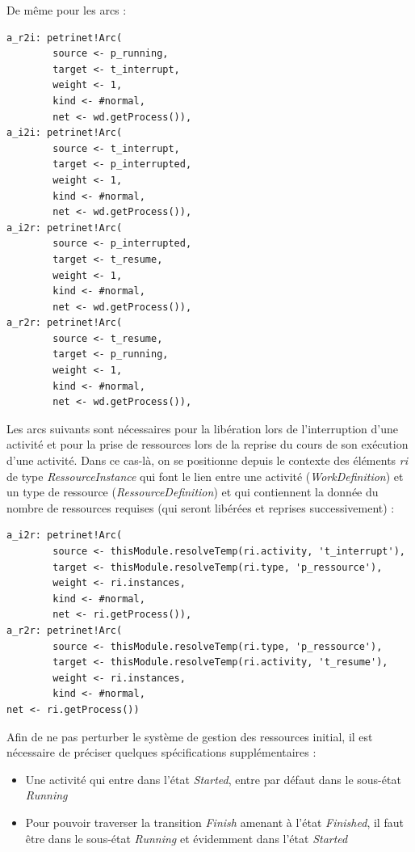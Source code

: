 De même pour les arcs :
\begin{verbatim}
a_r2i: petrinet!Arc(
        source <- p_running,
        target <- t_interrupt,
        weight <- 1,
        kind <- #normal,
        net <- wd.getProcess()),
a_i2i: petrinet!Arc(
        source <- t_interrupt,
        target <- p_interrupted,
        weight <- 1,
        kind <- #normal,
        net <- wd.getProcess()),
a_i2r: petrinet!Arc(
        source <- p_interrupted,
        target <- t_resume,
        weight <- 1,
        kind <- #normal,
        net <- wd.getProcess()),
a_r2r: petrinet!Arc(
        source <- t_resume,
        target <- p_running,
        weight <- 1,
        kind <- #normal,
        net <- wd.getProcess()),
\end{verbatim}

Les arcs suivants sont nécessaires pour la libération lors de l'interruption d'une activité et pour la prise de ressources lors de la reprise du cours de son exécution d'une activité. Dans ce cas-là, on se positionne depuis le contexte des éléments \textit{ri} de type \textit{RessourceInstance} qui font le lien entre une activité (\textit{WorkDefinition}) et un type de ressource (\textit{RessourceDefinition}) et qui contiennent la donnée du nombre de ressources requises (qui seront libérées et reprises successivement) :

\begin{verbatim}
a_i2r: petrinet!Arc(
        source <- thisModule.resolveTemp(ri.activity, 't_interrupt'),
        target <- thisModule.resolveTemp(ri.type, 'p_ressource'),
        weight <- ri.instances,
        kind <- #normal,
        net <- ri.getProcess()),
a_r2r: petrinet!Arc(
        source <- thisModule.resolveTemp(ri.type, 'p_ressource'),
        target <- thisModule.resolveTemp(ri.activity, 't_resume'),
        weight <- ri.instances,
        kind <- #normal,
net <- ri.getProcess())
\end{verbatim}

Afin de ne pas perturber le système de gestion des ressources initial, il est nécessaire de préciser quelques spécifications supplémentaires :
\begin{itemize}
\item Une activité qui entre dans l'état \textit{Started}, entre par défaut dans le sous-état \textit{Running}
\item Pour pouvoir traverser la transition \textit{Finish} amenant à l'état \textit{Finished}, il faut être dans le sous-état \textit{Running} et évidemment dans l'état \textit{Started}
\end{itemize}

